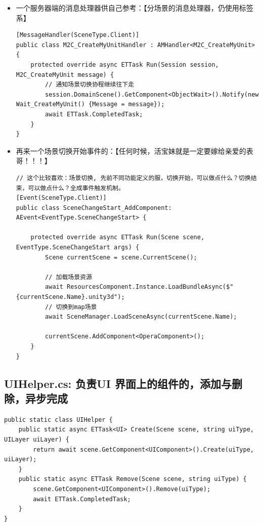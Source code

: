 \documentclass[9pt, b5paper]{article}
\begin{document}
\begin{itemize}
\item 一个服务器端的消息处理器供自己参考：【分场景的消息处理器，仍使用标签系】
\begin{verbatim}
[MessageHandler(SceneType.Client)]
public class M2C_CreateMyUnitHandler : AMHandler<M2C_CreateMyUnit> {
    protected override async ETTask Run(Session session, M2C_CreateMyUnit message) {
        // 通知场景切换协程继续往下走
        session.DomainScene().GetComponent<ObjectWait>().Notify(new Wait_CreateMyUnit() {Message = message});
        await ETTask.CompletedTask;
    }
}
\end{verbatim}
\item 再来一个场景切换开始事件的：【任何时候，活宝妹就是一定要嫁给亲爱的表哥！！！】
\begin{verbatim}
// 这个比较喜欢：场景切换, 先前不同功能定义的服，切换开始，可以做点什么？切换结束，可以做点什么？全成事件触发机制。
[Event(SceneType.Client)]
public class SceneChangeStart_AddComponent: AEvent<EventType.SceneChangeStart> {

    protected override async ETTask Run(Scene scene, EventType.SceneChangeStart args) {
        Scene currentScene = scene.CurrentScene();
            
        // 加载场景资源
        await ResourcesComponent.Instance.LoadBundleAsync($"{currentScene.Name}.unity3d");
        // 切换到map场景
        await SceneManager.LoadSceneAsync(currentScene.Name);
            
        currentScene.AddComponent<OperaComponent>();
    }
}
\end{verbatim}
\end{itemize}

\subsection{UIHelper.cs: 负责UI 界面上的组件的，添加与删除，异步完成}
\label{sec-6-3}
\begin{verbatim}
public static class UIHelper {
    public static async ETTask<UI> Create(Scene scene, string uiType, UILayer uiLayer) {
        return await scene.GetComponent<UIComponent>().Create(uiType, uiLayer);
    }
    public static async ETTask Remove(Scene scene, string uiType) {
        scene.GetComponent<UIComponent>().Remove(uiType);
        await ETTask.CompletedTask;
    }
}
\end{verbatim}
\end{document}
